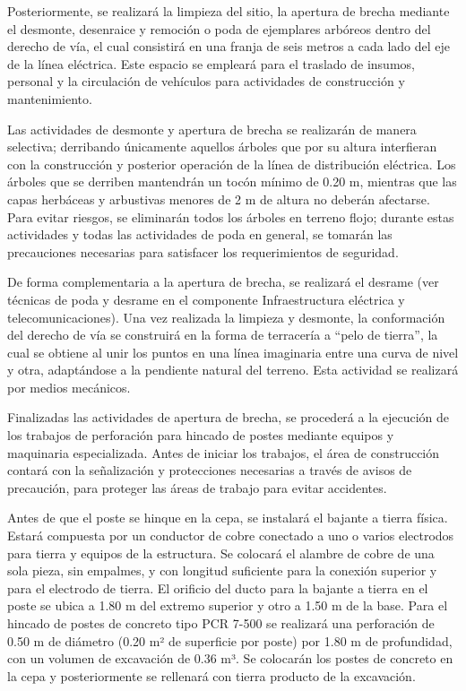 \documentclass{article}
\begin{document}
\bigskip

Posteriormente, se realizará la limpieza del sitio, la apertura de brecha mediante el desmonte, desenraice y remoción o poda de ejemplares arbóreos dentro del derecho de vía, el cual consistirá en una franja de seis metros a cada lado del eje de la línea eléctrica. Este espacio se empleará para el traslado de insumos, personal y la circulación de vehículos para actividades de construcción y mantenimiento.


\bigskip

Las actividades de desmonte y apertura de brecha se realizarán de manera selectiva; derribando únicamente aquellos árboles que por su altura interfieran con la construcción y posterior operación de la línea de distribución eléctrica. Los árboles que se derriben mantendrán un tocón mínimo de 0.20 m, mientras que las capas herbáceas y arbustivas menores de 2 m de altura no deberán afectarse. Para evitar riesgos, se eliminarán todos los árboles en terreno flojo; durante estas actividades y todas las actividades de poda en general, se tomarán las precauciones necesarias para satisfacer los requerimientos de seguridad.


\bigskip

De forma complementaria a la apertura de brecha, se realizará el desrame (ver técnicas de poda y desrame en el componente Infraestructura eléctrica y telecomunicaciones). Una vez realizada la limpieza y desmonte, la conformación del derecho de vía se construirá en la forma de terracería a “pelo de tierra”, la cual se obtiene al unir los puntos en una línea imaginaria entre una curva de nivel y otra, adaptándose a la pendiente natural del terreno. Esta actividad se realizará por medios mecánicos.


\bigskip

Finalizadas las actividades de apertura de brecha, se procederá a la ejecución de los trabajos de perforación para hincado de postes mediante equipos y maquinaria especializada. Antes de iniciar los trabajos, el área de construcción contará con la señalización y protecciones necesarias a través de avisos de precaución, para proteger las áreas de trabajo para evitar accidentes.


\bigskip

Antes de que el poste se hinque en la cepa, se instalará el bajante a tierra física. Estará compuesta por un conductor de cobre conectado a uno o varios electrodos para tierra y equipos de la estructura. Se colocará el alambre de cobre de una sola pieza, sin empalmes, y con longitud suficiente para la conexión superior y para el electrodo de tierra. El orificio del ducto para la bajante a tierra en el poste se ubica a 1.80 m del extremo superior y otro a 1.50 m de la base. Para el hincado de postes de concreto tipo PCR 7-500 se realizará una perforación de 0.50 m de diámetro (0.20 m² de superficie por poste) por 1.80 m de profundidad, con un volumen de excavación de 0.36 m³. Se colocarán los postes de concreto en la cepa y posteriormente se rellenará con tierra producto de la excavación. 
\end{document}
